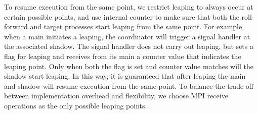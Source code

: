 To resume execution from the same point, we restrict leaping to always occur at certain possible points, and use internal counter to make sure that both the roll forward and target processes start leaping from the same point. For example, when a main initiates a leaping, the coordinator will trigger a signal handler at the associated shadow. The signal handler does not carry out leaping, but sets a flag for leaping and receives from its main a counter value that indicates the leaping point. %
Only when both the flag is set and counter value matches will the shadow start leaping. In this way, it is guaranteed that after leaping the main and shadow will resume execution from the same point. To balance the trade-off between implementation overhead and flexibility, we choose MPI receive operations as the only possible leaping points. 

 





